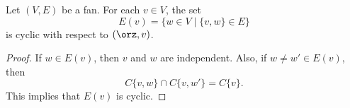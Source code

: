 


\begin{lemma}  Let $(V,E)$ be a fan.
For each $v\in V$, the set
        $$
        E(v) = \{w\in V\mid \{v,w\}\in E\}
        $$
        is cyclic with respect to $(\orz,v)$.
\end{lemma}
%

\begin{proof}  If $w\in E(v)$, then $v$ and $w$ are independent.
Also, if $w\ne w'\in E(v)$, then
$$
C\{v,w\}\cap C\{v,w'\} = C\{v\}.
$$
This implies that $E(v)$ is cyclic.
\end{proof}

